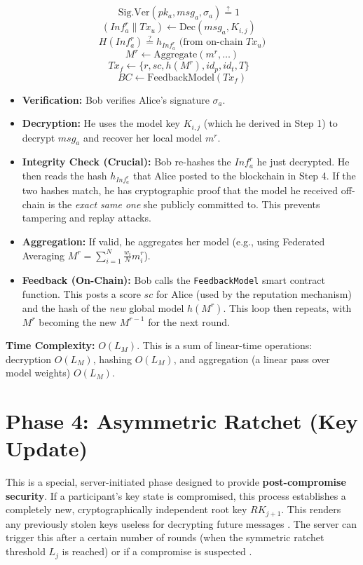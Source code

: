 \documentclass[12pt]{article}
\begin{document}
\[
\text{Sig.Ver}(pk_a, msg_a, \sigma_a) \stackrel{?}{=} 1 \text{ }
\]
\[
(Inf_a^r \parallel Tx_u) \leftarrow \text{Dec}(msg_a, K_{i,j}) \text{ }
\]
\[
H(Inf_a^r) \stackrel{?}{=} h_{Inf_a^r} \text{ (from on-chain } Tx_u)
\]
\[
M^r \leftarrow \text{Aggregate}(m^r, \dots)
\]
\[
Tx_f \leftarrow \{r, sc, h(M^r), id_p, id_t, T\} \text{ }
\]
\[
BC \leftarrow \text{FeedbackModel}(Tx_f)
\]
\begin{itemize}
    \item \textbf{Verification:} Bob verifies Alice's signature \( \sigma_a \).
    \item \textbf{Decryption:} He uses the model key \( K_{i,j} \) (which he derived in Step 1) to decrypt \( msg_a \) and recover her local model \( m^r \).
    \item \textbf{Integrity Check (Crucial):} Bob re-hashes the \( Inf_a^r \) he just decrypted. He then reads the hash \( h_{Inf_a^r} \) that Alice posted to the blockchain in Step 4. If the two hashes match, he has cryptographic proof that the model he received off-chain is the \textit{exact same one} she publicly committed to. This prevents tampering and replay attacks.
    \item \textbf{Aggregation:} If valid, he aggregates her model (e.g., using Federated Averaging \( M^r = \sum_{i=1}^{N} \frac{w_i}{N} m_i^r \)).
    \item \textbf{Feedback (On-Chain):} Bob calls the \texttt{FeedbackModel} smart contract function. This posts a score \( sc \) for Alice (used by the reputation mechanism) and the hash of the \textit{new} global model \( h(M^r) \). This loop then repeats, with \( M^r \) becoming the new \( M^{r-1} \) for the next round.
\end{itemize}
\textbf{Time Complexity:} \( O(L_M) \). This is a sum of linear-time operations: decryption \( O(L_M) \), hashing \( O(L_M) \), and aggregation (a linear pass over model weights) \( O(L_M) \).

\newpage

\section*{Phase 4: Asymmetric Ratchet (Key Update)}

This is a special, server-initiated phase designed to provide \textbf{post-compromise security}. If a participant's key state is compromised, this process establishes a completely new, cryptographically independent root key \( RK_{j+1} \). This renders any previously stolen keys useless for decrypting future messages . The server can trigger this after a certain number of rounds (when the symmetric ratchet threshold \(L_j\) is reached) or if a compromise is suspected .
\end{document}
